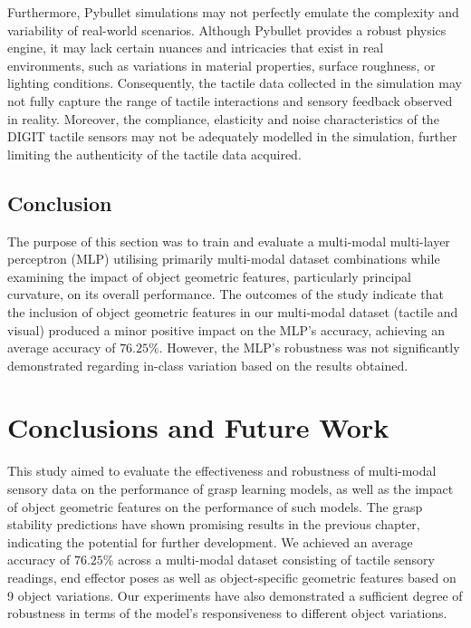 \documentclass[11pt, a4paper]{report}
\begin{document}
Furthermore, Pybullet simulations may not perfectly emulate the complexity and variability of real-world scenarios. Although Pybullet provides a robust physics engine, it may lack certain nuances and intricacies that exist in real environments, such as variations in material properties, surface roughness, or lighting conditions. Consequently, the tactile data collected in the simulation may not fully capture the range of tactile interactions and sensory feedback observed in reality. Moreover, the compliance, elasticity and noise characteristics of the DIGIT tactile sensors may not  be adequately modelled in the simulation, further limiting the authenticity of the tactile data acquired.


\section{Conclusion}\label{sec:5.5}
The purpose of this section was to train and evaluate a multi-modal multi-layer perceptron (MLP) utilising primarily multi-modal dataset combinations while examining the impact of object geometric features, particularly principal curvature, on its overall performance. The outcomes of the study indicate that the inclusion of object geometric features in our multi-modal dataset (tactile and visual) produced a minor positive impact on the MLP's accuracy, achieving an average accuracy of $76.25\%$. However, the MLP's robustness was not significantly demonstrated regarding in-class variation based on the results obtained.



\chapter{Conclusions and Future Work}
\label{chap:6}
This study aimed to evaluate the effectiveness and robustness of multi-modal sensory data on the performance of grasp learning models, as well as the impact of object geometric features on the performance of such models. The grasp stability predictions have shown promising results in the previous chapter, indicating the potential for further development. We achieved an average accuracy of $76.25\%$ across a multi-modal dataset consisting of tactile sensory readings, end effector poses as well as object-specific geometric features based on 9 object variations. Our experiments have also demonstrated a sufficient degree of robustness in terms of the model's responsiveness to different object variations.\\
\end{document}
